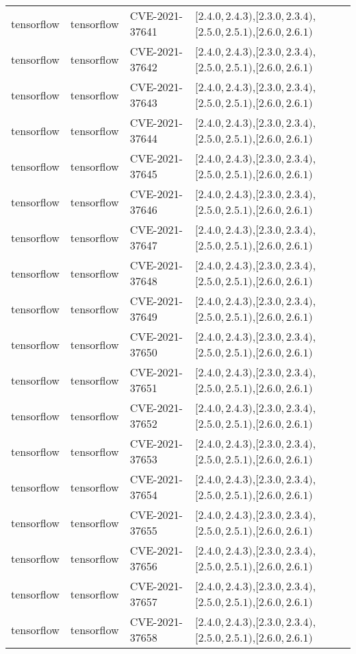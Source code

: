 \begin{tabular}{llll}
tensorflow & tensorflow & CVE-2021-37641 & $[2.4.0,2.4.3)$,$[2.3.0,2.3.4)$,$[2.5.0,2.5.1)$,$[2.6.0,2.6.1)$ \\
tensorflow & tensorflow & CVE-2021-37642 & $[2.4.0,2.4.3)$,$[2.3.0,2.3.4)$,$[2.5.0,2.5.1)$,$[2.6.0,2.6.1)$ \\
tensorflow & tensorflow & CVE-2021-37643 & $[2.4.0,2.4.3)$,$[2.3.0,2.3.4)$,$[2.5.0,2.5.1)$,$[2.6.0,2.6.1)$ \\
tensorflow & tensorflow & CVE-2021-37644 & $[2.4.0,2.4.3)$,$[2.3.0,2.3.4)$,$[2.5.0,2.5.1)$,$[2.6.0,2.6.1)$ \\
tensorflow & tensorflow & CVE-2021-37645 & $[2.4.0,2.4.3)$,$[2.3.0,2.3.4)$,$[2.5.0,2.5.1)$,$[2.6.0,2.6.1)$ \\
tensorflow & tensorflow & CVE-2021-37646 & $[2.4.0,2.4.3)$,$[2.3.0,2.3.4)$,$[2.5.0,2.5.1)$,$[2.6.0,2.6.1)$ \\
tensorflow & tensorflow & CVE-2021-37647 & $[2.4.0,2.4.3)$,$[2.3.0,2.3.4)$,$[2.5.0,2.5.1)$,$[2.6.0,2.6.1)$ \\
tensorflow & tensorflow & CVE-2021-37648 & $[2.4.0,2.4.3)$,$[2.3.0,2.3.4)$,$[2.5.0,2.5.1)$,$[2.6.0,2.6.1)$ \\
tensorflow & tensorflow & CVE-2021-37649 & $[2.4.0,2.4.3)$,$[2.3.0,2.3.4)$,$[2.5.0,2.5.1)$,$[2.6.0,2.6.1)$ \\
tensorflow & tensorflow & CVE-2021-37650 & $[2.4.0,2.4.3)$,$[2.3.0,2.3.4)$,$[2.5.0,2.5.1)$,$[2.6.0,2.6.1)$ \\
tensorflow & tensorflow & CVE-2021-37651 & $[2.4.0,2.4.3)$,$[2.3.0,2.3.4)$,$[2.5.0,2.5.1)$,$[2.6.0,2.6.1)$ \\
tensorflow & tensorflow & CVE-2021-37652 & $[2.4.0,2.4.3)$,$[2.3.0,2.3.4)$,$[2.5.0,2.5.1)$,$[2.6.0,2.6.1)$ \\
tensorflow & tensorflow & CVE-2021-37653 & $[2.4.0,2.4.3)$,$[2.3.0,2.3.4)$,$[2.5.0,2.5.1)$,$[2.6.0,2.6.1)$ \\
tensorflow & tensorflow & CVE-2021-37654 & $[2.4.0,2.4.3)$,$[2.3.0,2.3.4)$,$[2.5.0,2.5.1)$,$[2.6.0,2.6.1)$ \\
tensorflow & tensorflow & CVE-2021-37655 & $[2.4.0,2.4.3)$,$[2.3.0,2.3.4)$,$[2.5.0,2.5.1)$,$[2.6.0,2.6.1)$ \\
tensorflow & tensorflow & CVE-2021-37656 & $[2.4.0,2.4.3)$,$[2.3.0,2.3.4)$,$[2.5.0,2.5.1)$,$[2.6.0,2.6.1)$ \\
tensorflow & tensorflow & CVE-2021-37657 & $[2.4.0,2.4.3)$,$[2.3.0,2.3.4)$,$[2.5.0,2.5.1)$,$[2.6.0,2.6.1)$ \\
tensorflow & tensorflow & CVE-2021-37658 & $[2.4.0,2.4.3)$,$[2.3.0,2.3.4)$,$[2.5.0,2.5.1)$,$[2.6.0,2.6.1)$ \\

\end{tabular}
